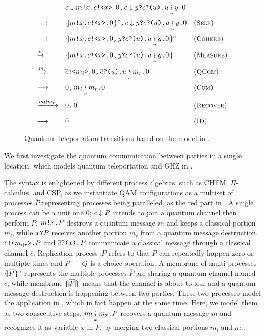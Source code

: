 \begin{figure}[t]
{\small
\[
\begin{array}{lll}
&
c\downarrow m\texttt{!}x\texttt{.}c\texttt{!<}x\texttt{>}\texttt{.}0\texttt{,}\,
c\downarrow y\texttt{?}c\texttt{?(}u\texttt{)}\texttt{.}u\underset{v}{\wr}y\texttt{.}0

&
\\[1em]
\longrightarrow
&
\{\!| m\texttt{!}x\texttt{.}c\texttt{!<}x\texttt{>}\texttt{.}0 |\!\}^{c}\texttt{,}\,c\downarrow y\texttt{?}c\texttt{?(}u\texttt{)}\texttt{.}u\underset{v}{\wr}y\texttt{.}0
&
({\small \textsc{Self}})
\\[1em]
\longrightarrow
&
\{\!| m\texttt{!}x\texttt{.}c\texttt{!<}x\texttt{>}\texttt{.}0\texttt{,}\,y\texttt{?}c\texttt{?(}u\texttt{)}\texttt{.}u\underset{v}{\wr}y\texttt{.}0 |\!\}^{c}
&
({\small \textsc{Cohere}})
\\[1em]
\xrightarrow{c}
&
\{\!| m\texttt{!}x\texttt{.}\overline{c}\texttt{!<}x\texttt{>}\texttt{.}0\texttt{,}\,y\texttt{?}\overline{c}\texttt{?(}u\texttt{)}\texttt{.}u\underset{v}{\wr}y\texttt{.}0 |\!\}
&
({\small \textsc{Measure}})
\\[1em]
\xrightarrow{m}
&
\overline{c}\texttt{!<}m_l\texttt{>}\texttt{.}0\texttt{,}\,\overline{c}\texttt{?(}u\texttt{)}\texttt{.}u\underset{v}{\wr}m_r\texttt{.}0
&
({\small \textsc{QCom}})
\\[1em]
\longrightarrow
&
0\texttt{,}\,m_l\underset{v}{\wr}m_r\texttt{.}0
&
({\small \textsc{Com}})
\\[1em]
\xrightarrow{m_l\wr m_r}
&
0\texttt{,}\,0
&
({\small \textsc{Recover}})
\\[1em]
\longrightarrow
&
0
&
({\small \textsc{ID}})
\end{array}
\]
}
\caption{Quantum Teleportation transitions based on the model in .}
  \label{fig:tele-example}
\end{figure}

We first investigate the quantum communication between parties in a single location, which models quantum teleportation and GHZ in .

The syntax is enlightened by different process algebras, such as CHEM, $\Pi$-calculus, and CSP,
as we instantiate QAM configurations as a multiset of processes $\overline{P}$ representing processes being paralleled,
as the red part in .
A single process can be a unit one $0$; $c\downarrow P$ intends to join a quantum channel then perform $P$.
$m\texttt{!}x\texttt{.}P$ destroys a quantum message $m$ and keeps a classical portion $m_l$,
while $x\texttt{?}P$ receives another portion $m_r$ from a quantum message destruction.
$\overline{c}\texttt{!<}m_{l\mid r}\texttt{>}\texttt{.}P$ and $\overline{c}\texttt{?(}x\texttt{)}\texttt{.}P$
communicate a classical message through a classical channel $\overline{c}$.
Replication process $\comp{P}$ refers to that $P$ can repeatedly happen zero or multiple times
and $P\,+\,Q$ is a choice operation.
A membrane of multi-processes $\{\!| \overline{P} |\!\}^{c}$ represents the multiple processes $\overline{P}$ are sharing a quantum channel named $c$, while membrane $\{\!| \overline{P} |\!\}$ means that the channel is about to lose and a quantum message destruction is happening between two parties.
These two processes model the  application in ,
which in fact happen at the same time. Here, we model them as two consecutive steps.
$m_l\underset{x}{\wr}m_r\texttt{.}P$ recovers a quantum message $m$ and recognizes it as variable $x$ in $P$, by merging two classical portions $m_l$ and $m_r$.

